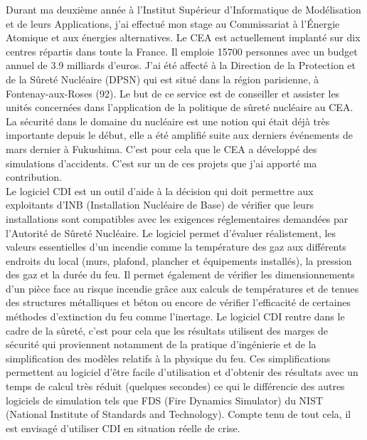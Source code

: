 \documentclass[a4paper,11pt]{article}
\begin{document}
\normalsize{
Durant ma deuxième année à l'Institut Supérieur d'Informatique de Modélisation et de leurs Applications, j'ai effectué mon stage au Commissariat à l'Énergie Atomique et aux énergies alternatives. Le CEA est actuellement implanté sur dix centres répartis dans toute la France. Il emploie 15700 personnes avec un budget annuel de 3.9 milliards d'euros. J'ai été affecté à la Direction de la Protection et de la Sûreté Nucléaire (DPSN) qui est situé dans la région parisienne, à Fontenay-aux-Roses (92). Le but de ce service est de conseiller et assister les unités concernées dans l'application de la politique de sûreté nucléaire au CEA.\\

La sécurité dans le domaine du nucléaire est une notion qui était déjà très importante depuis le début, elle a été amplifié suite aux derniers événements de mars dernier à Fukushima. C'est pour cela que le CEA a développé des simulations d'accidents. C'est sur un de ces projets que j'ai apporté ma contribution.\\

 Le logiciel CDI est un outil d'aide à la décision qui doit permettre aux exploitants d'INB (Installation Nucléaire de Base) de vérifier que leurs installations sont compatibles avec les exigences réglementaires demandées par l'Autorité de Sûreté Nucléaire. Le logiciel permet d'évaluer réalistement, les valeurs essentielles d'un incendie comme la température des gaz aux différents endroits du local (murs, plafond, plancher et équipements installés), la pression des gaz et la durée du feu. Il permet également de vérifier les dimensionnements d'un pièce face au risque incendie grâce aux calculs de températures et de tenues des structures métalliques et béton ou encore de vérifier l'efficacité de certaines méthodes d'extinction du feu comme l'inertage. Le logiciel CDI rentre dans le cadre de la sûreté, c'est pour cela que les résultats utilisent des marges de sécurité qui proviennent notamment de la pratique d'ingénierie et de la simplification des modèles relatifs à la physique du feu. Ces simplifications permettent au logiciel d'être facile d'utilisation et d'obtenir des résultats avec un temps de calcul très réduit (quelques secondes) ce qui le différencie des autres logiciels de simulation tels que FDS (Fire Dynamics Simulator) du NIST (National Institute of Standards and Technology). Compte tenu de tout cela, il est envisagé d'utiliser CDI en situation réelle de crise.
}

\newpage
\end{document}
